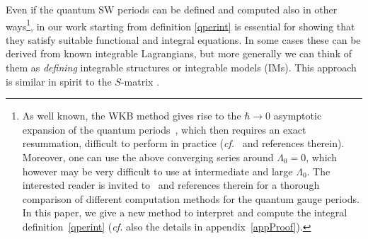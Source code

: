 \documentclass[11pt,a4paper]{elsarticle}
\numberwithin{figure}{section}
\numberwithin{table}{section}
\begin{document}
Even if the quantum SW periods can be defined and computed also in other ways\footnote{As well known, the WKB method gives rise to the $\hbar \to 0$ asymptotic expansion of the quantum periods~\cite{MironovMorozov:2009,ItoKannoOkubo:2017}, which then requires an exact resummation, difficult to perform in practice ({\it cf.}~\cite{GrassiGuMarino} and references therein). Moreover, one can use the above converging series around $\Lambda_0=0$, which however may be very difficult to use at intermediate and large $\Lambda_0$. The interested reader is invited to~\cite{GrassiHaoNeitzke:2021} and references therein for a thorough comparison of different computation methods for the quantum gauge periods. In this paper, we give a new method to interpret and compute the integral definition~\eqref{qperint} ({\it cf.} also the details in appendix~\ref{appProof}).}, in our work starting from definition \eqref{qperint} is essential for showing that they satisfy suitable functional and integral equations. In some cases these can be derived from known integrable Lagrangians, but more generally we can think of them as \emph{defining} integrable structures or integrable models (IMs). This approach is similar in spirit to the $S$-matrix \cite{Mussardo:1992}.
\end{document}
